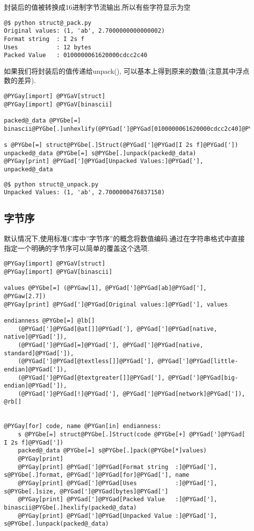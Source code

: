 \documentclass[a4paper,10pt,english]{manual}
\begin{document}
封装后的值被转换成16进制字节流输出,所以有些字符显示为空

\begin{Verbatim}[commandchars=@\[\]]
@$ python struct@_pack.py
Original values: (1, 'ab', 2.7000000000000002)
Format string  : I 2s f
Uses           : 12 bytes
Packed Value   : 0100000061620000cdcc2c40
\end{Verbatim}

如果我们将封装后的值传递给unpack(), 可以基本上得到原来的数值(注意其中浮点数的差异).

\begin{Verbatim}[commandchars=@\[\]]
@PYGay[import] @PYGaV[struct]
@PYGay[import] @PYGaV[binascii]

packed@_data @PYGbe[=] binascii@PYGbe[.]unhexlify(@PYGad[']@PYGad[0100000061620000cdcc2c40]@PYGad['])

s @PYGbe[=] struct@PYGbe[.]Struct(@PYGad[']@PYGad[I 2s f]@PYGad['])
unpacked@_data @PYGbe[=] s@PYGbe[.]unpack(packed@_data)
@PYGay[print] @PYGad[']@PYGad[Unpacked Values:]@PYGad['], unpacked@_data
\end{Verbatim}

\begin{Verbatim}[commandchars=@\[\]]
@$ python struct@_unpack.py
Unpacked Values: (1, 'ab', 2.7000000476837158)
\end{Verbatim}


\subsection{字节序}

默认情况下,使用标准C库中''字节序''的概念将数值编码.通过在字符串格式中直接指定一个明确的字节序可以简单的覆盖这个选项.

\begin{Verbatim}[commandchars=@\[\]]
@PYGay[import] @PYGaV[struct]
@PYGay[import] @PYGaV[binascii]

values @PYGbe[=] (@PYGaw[1], @PYGad[']@PYGad[ab]@PYGad['], @PYGaw[2.7])
@PYGay[print] @PYGad[']@PYGad[Original values:]@PYGad['], values

endianness @PYGbe[=] @lb[]
    (@PYGad[']@PYGad[@at[]]@PYGad['], @PYGad[']@PYGad[native, native]@PYGad[']),
    (@PYGad[']@PYGad[=]@PYGad['], @PYGad[']@PYGad[native, standard]@PYGad[']),
    (@PYGad[']@PYGad[@textless[]]@PYGad['], @PYGad[']@PYGad[little-endian]@PYGad[']),
    (@PYGad[']@PYGad[@textgreater[]]@PYGad['], @PYGad[']@PYGad[big-endian]@PYGad[']),
    (@PYGad[']@PYGad[!]@PYGad['], @PYGad[']@PYGad[network]@PYGad[']),
@rb[]


@PYGay[for] code, name @PYGan[in] endianness:
    s @PYGbe[=] struct@PYGbe[.]Struct(code @PYGbe[+] @PYGad[']@PYGad[ I 2s f]@PYGad['])
    packed@_data @PYGbe[=] s@PYGbe[.]pack(@PYGbe[*]values)
    @PYGay[print]
    @PYGay[print] @PYGad[']@PYGad[Format string  :]@PYGad['], s@PYGbe[.]format, @PYGad[']@PYGad[for]@PYGad['], name
    @PYGay[print] @PYGad[']@PYGad[Uses           :]@PYGad['], s@PYGbe[.]size, @PYGad[']@PYGad[bytes]@PYGad[']
    @PYGay[print] @PYGad[']@PYGad[Packed Value   :]@PYGad['], binascii@PYGbe[.]hexlify(packed@_data)
    @PYGay[print] @PYGad[']@PYGad[Unpacked Value :]@PYGad['], s@PYGbe[.]unpack(packed@_data)
\end{Verbatim}
\end{document}
